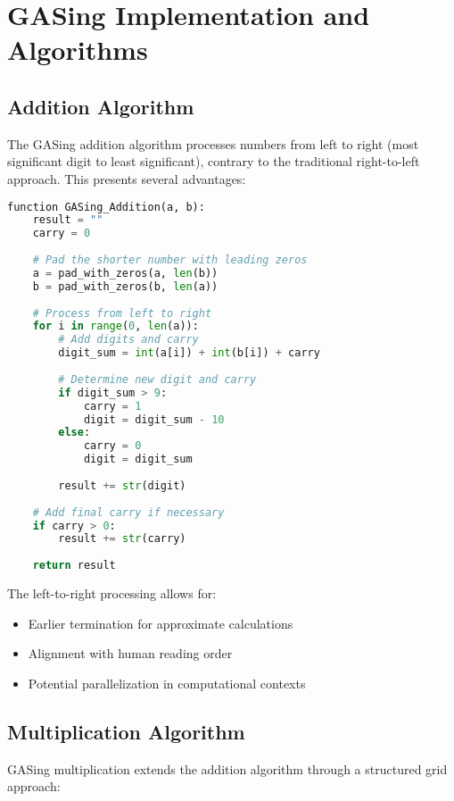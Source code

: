 \section{GASing Implementation and Algorithms}\label{sec:methodology}

\subsection{Addition Algorithm}

The GASing addition algorithm processes numbers from left to right (most significant digit to least significant), contrary to the traditional right-to-left approach. This presents several advantages:

\begin{lstlisting}[language=Python, caption=GASing Addition Algorithm]
function GASing_Addition(a, b):
    result = ""
    carry = 0
    
    # Pad the shorter number with leading zeros
    a = pad_with_zeros(a, len(b))
    b = pad_with_zeros(b, len(a))
    
    # Process from left to right
    for i in range(0, len(a)):
        # Add digits and carry
        digit_sum = int(a[i]) + int(b[i]) + carry
        
        # Determine new digit and carry
        if digit_sum > 9:
            carry = 1
            digit = digit_sum - 10
        else:
            carry = 0
            digit = digit_sum
            
        result += str(digit)
    
    # Add final carry if necessary
    if carry > 0:
        result += str(carry)
        
    return result
\end{lstlisting}

The left-to-right processing allows for:
\begin{itemize}
    \item Earlier termination for approximate calculations
    \item Alignment with human reading order
    \item Potential parallelization in computational contexts
\end{itemize}

\subsection{Multiplication Algorithm}

GASing multiplication extends the addition algorithm through a structured grid approach:

